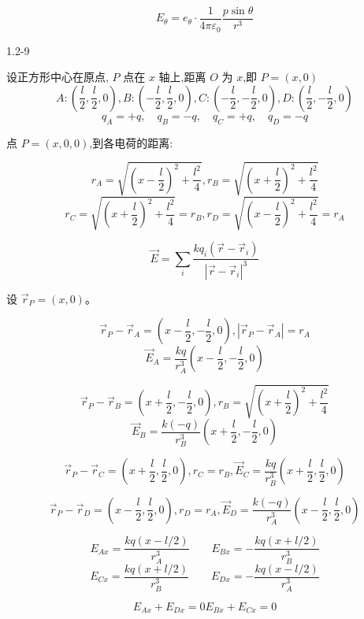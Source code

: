 \documentclass{article}
\begin{document}
$$E_\theta = e_\theta \cdot \frac{1}{4\pi\varepsilon_0}\frac{p\sin\theta}{r^3}$$





\newpage

1.2-9


设正方形中心在原点, $ P $ 点在 $ x $ 轴上,距离 $ O $ 为 $ x $,即 $ P = (x, 0) $
$$
A: \left( \frac{l}{2}, \frac{l}{2}, 0 \right),
B: \left( -\frac{l}{2}, \frac{l}{2}, 0 \right),
C: \left( -\frac{l}{2}, -\frac{l}{2}, 0 \right),
D: \left( \frac{l}{2}, -\frac{l}{2}, 0 \right)
$$
$$q_A = +q, \quad q_B = -q, \quad q_C = +q, \quad q_D = -q$$

点 $ P = (x, 0, 0) $,到各电荷的距离:

$$r_A = \sqrt{\left(x - \frac{l}{2}\right)^2 + \frac{l^2}{4}},r_B = \sqrt{\left(x + \frac{l}{2}\right)^2 + \frac{l^2}{4}}$$
$$r_C = \sqrt{\left(x + \frac{l}{2}\right)^2 + \frac{l^2}{4}} = r_B,r_D = \sqrt{\left(x - \frac{l}{2}\right)^2 + \frac{l^2}{4}} = r_A$$

$$\vec{E} = \sum_{i} \frac{k q_i (\vec{r} - \vec{r}_i)}{|\vec{r} - \vec{r}_i|^3}$$

设 $ \vec{r}_P = (x, 0) $。

$$\vec{r}_P - \vec{r}_A = \left( x - \frac{l}{2}, -\frac{l}{2}, 0 \right),|\vec{r}_P - \vec{r}_A| = r_A$$
$$\vec{E}_A = \frac{k q}{r_A^3} \left( x - \frac{l}{2}, -\frac{l}{2}, 0 \right)$$


$$\vec{r}_P - \vec{r}_B = \left( x + \frac{l}{2},-\frac{l}{2},0 \right),r_B = \sqrt{(x+\frac{l}{2})^2 + \frac{l^2}{4}}$$
$$\vec{E}_B = \frac{k (-q)}{r_B^3} \left( x + \frac{l}{2}, -\frac{l}{2}, 0 \right)$$

$$\vec{r}_P - \vec{r}_C = \left( x + \frac{l}{2}, \frac{l}{2}, 0 \right),r_C = r_B,\vec{E}_C = \frac{k q}{r_B^3} \left( x + \frac{l}{2}, \frac{l}{2}, 0 \right)$$

$$\vec{r}_P - \vec{r}_D = \left( x - \frac{l}{2}, \frac{l}{2}, 0 \right),r_D = r_A,\vec{E}_D = \frac{k (-q)}{r_A^3} \left( x - \frac{l}{2}, \frac{l}{2}, 0 \right)$$

$$E_{Ax} = \frac{k q (x - l/2)}{r_A^3}\qquad E_{Bx} = -\frac{k q (x + l/2)}{r_B^3}$$
$$E_{Cx} = \frac{k q (x + l/2)}{r_B^3}\qquad E_{Dx} = -\frac{k q (x - l/2)}{r_A^3}$$

$$ E_{Ax} + E_{Dx} = 0 E_{Bx} + E_{Cx} = 0 $$  
\end{document}
